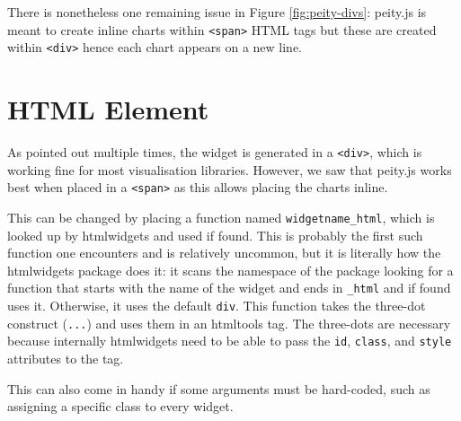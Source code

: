 \documentclass[10pt,]{krantz}
\makeatletter
\newenvironment{Shaded}{\begin{snugshade}}{\end{snugshade}}
\newcommand{\ControlFlowTok}[1]{\textcolor[rgb]{0.27,0.27,0.27}{\textbf{#1}}}
\newcommand{\DataTypeTok}[1]{\textcolor[rgb]{0.27,0.27,0.27}{#1}}
\newcommand{\KeywordTok}[1]{\textcolor[rgb]{0.27,0.27,0.27}{\textbf{#1}}}
\newcommand{\NormalTok}[1]{#1}
\newcommand{\OperatorTok}[1]{\textcolor[rgb]{0.43,0.43,0.43}{\textbf{#1}}}
\newcommand{\StringTok}[1]{\textcolor[rgb]{0.5,0.5,0.5}{#1}}
\newenvironment{kframe}{%
\medskip{}
\setlength{\fboxsep}{.8em}
 \def\at@end@of@kframe{}%
 \ifinner\ifhmode%
  \def\at@end@of@kframe{\end{minipage}}%
  \begin{minipage}{\columnwidth}%
 \fi\fi%
 \def\FrameCommand##1{\hskip\@totalleftmargin \hskip-\fboxsep
 \colorbox{shadecolor}{##1}\hskip-\fboxsep
     \hskip-\linewidth \hskip-\@totalleftmargin \hskip\columnwidth}%
 \MakeFramed {\advance\hsize-\width
   \@totalleftmargin\z@ \linewidth\hsize
   \@setminipage}}%
 {\par\unskip\endMakeFramed%
 \at@end@of@kframe}
\renewenvironment{Shaded}{\begin{kframe}}{\end{kframe}}
\makeatother
\begin{document}
There is nonetheless one remaining issue in Figure \ref{fig:peity-divs}: peity.js is meant to create inline charts within \texttt{\textless{}span\textgreater{}} HTML tags but these are created within \texttt{\textless{}div\textgreater{}} hence each chart appears on a new line.

\hypertarget{widgets-realistic-html-element}{%
\section{HTML Element}\label{widgets-realistic-html-element}}

As pointed out multiple times, the widget is generated in a \texttt{\textless{}div\textgreater{}}, which is working fine for most visualisation libraries. However, we saw that peity.js works best when placed in a \texttt{\textless{}span\textgreater{}} as this allows placing the charts inline.

This can be changed by placing a function named \texttt{widgetname\_html}, which is looked up by htmlwidgets and used if found. This is probably the first such function one encounters and is relatively uncommon, but it is literally how the htmlwidgets package does it: it scans the namespace of the package looking for a function that starts with the name of the widget and ends in \texttt{\_html} and if found uses it. Otherwise, it uses the default \texttt{div}. This function takes the three-dot construct (\texttt{...}) and uses them in an htmltools tag. The three-dots are necessary because internally htmlwidgets need to be able to pass the \texttt{id}, \texttt{class}, and \texttt{style} attributes to the tag.

\begin{Shaded}
\end{Shaded}

This can also come in handy if some arguments must be hard-coded, such as assigning a specific class to every widget.

\begin{Shaded}
\end{Shaded}
\end{document}
